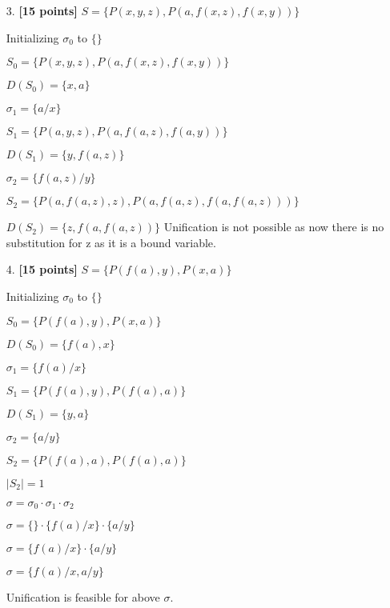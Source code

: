 \documentclass{article}
\begin{document}
\begin{enumerate}

\item[3.] \textbf{[15 points]}
  $S = \{ P(x,y,z), P(a,f(x,z),f(x,y)) \}$
\begin{answer}
        Initializing $\sigma_0$ to $\{\}$
		
		$S_0 = \{ P(x,y,z), P(a,f(x,z),f(x,y)) \}$
		
		$D(S_0) = \{x, a\}$
		\bigskip
		
		$\sigma_1 = \{a/x\}$
		
		$S_1 = \{ P(a,y,z), P(a,f(a,z),f(a,y)) \}$
		
		$D(S_1) = \{y, f(a,z)\}$
		\bigskip
		
		$\sigma_2 = \{f(a,z)/y\}$
		
		$S_2 = \{ P(a,f(a,z),z), P(a,f(a,z),f(a,f(a,z))) \}$
		
		$D(S_2) = \{z, f(a,f(a,z))\}$
		Unification is not possible as now there is no substitution for z as it is a bound variable.
\end{answer}

\item[4.] \textbf{[15 points]}
  $S = \{ P(f(a),y), P(x,a) \}$
  \begin{answer}
        Initializing $\sigma_0$ to $\{\}$
		
		$S_0 = \{ P(f(a),y), P(x,a) \}$
		
		$D(S_0) = \{f(a), x\}$
		\bigskip
		
		$\sigma_1 = \{f(a)/x\}$
		
		$S_1 = \{ P(f(a),y), P(f(a),a) \}$
		
		$D(S_1) = \{y, a\}$
		\bigskip
		
		$\sigma_2 = \{a/y\}$
		
		$S_2 = \{ P(f(a),a), P(f(a),a) \}$
		
		$|S_2| = 1$		
		\bigskip
		
		$\sigma = \sigma_0 \cdot{} \sigma_1 \cdot{} \sigma_2$
		
		$\sigma = \{\} \cdot{} \{f(a)/x\} \cdot{} \{a/y\}$
		
		$\sigma = \{f(a)/x\} \cdot{} \{a/y\}$
		
		$\sigma = \{f(a)/x, a/y\}$
		
		Unification is feasible for above $\sigma$.
\end{answer}
\end{enumerate}


\end{document}
